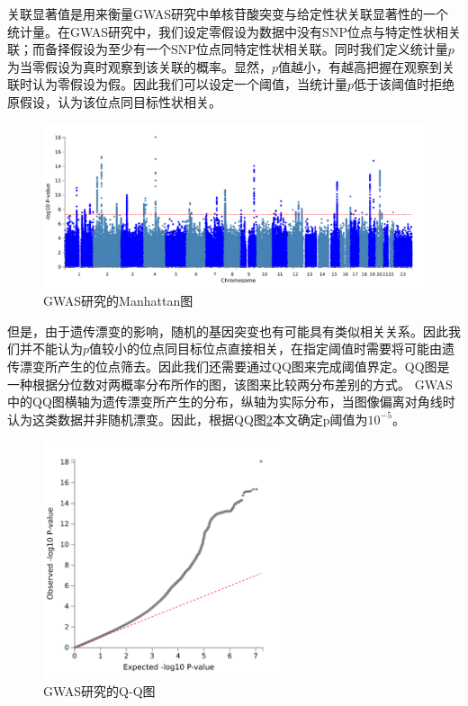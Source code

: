 关联显著值是用来衡量GWAS研究中单核苷酸突变与给定性状关联显著性的一个统计量。在GWAS研究中，我们设定零假设为数据中没有SNP位点与特定性状相关联；而备择假设为至少有一个SNP位点同特定性状相关联。同时我们定义统计量$p$为当零假设为真时观察到该关联的概率。显然，$p$值越小，有越高把握在观察到关联时认为零假设为假。因此我们可以设定一个阈值，当统计量$p$低于该阈值时拒绝原假设，认为该位点同目标性状相关。\cite{chen_revisiting_2021}
\begin{figure}[!ht]
\centering
\includegraphics[width=\textwidth]{figures/Chapter2/Maha.png}
\caption{GWAS研究的Manhattan图} \label{fig_ch2}
\end{figure}
但是，由于遗传漂变的影响，随机的基因突变也有可能具有类似相关关系。因此我们并不能认为$p$值较小的位点同目标位点直接相关，在指定阈值时需要将可能由遗传漂变所产生的位点筛去。因此我们还需要通过QQ图来完成阈值界定。QQ图是一种根据分位数对两概率分布所作的图，该图来比较两分布差别的方式。\cite{wilk_probability_1968} GWAS中的QQ图横轴为遗传漂变所产生的分布，纵轴为实际分布，当图像偏离对角线时认为这类数据并非随机漂变。因此，根据QQ图\ref{ch2_qqplot}本文确定p阈值为$10^{-5}$。

\begin{figure}[!ht]
\centering
\includegraphics[width=7cm]{figures/Chapter2/qq.png}
\caption{GWAS研究的Q-Q图} \label{ch2_qqplot}
\end{figure}


